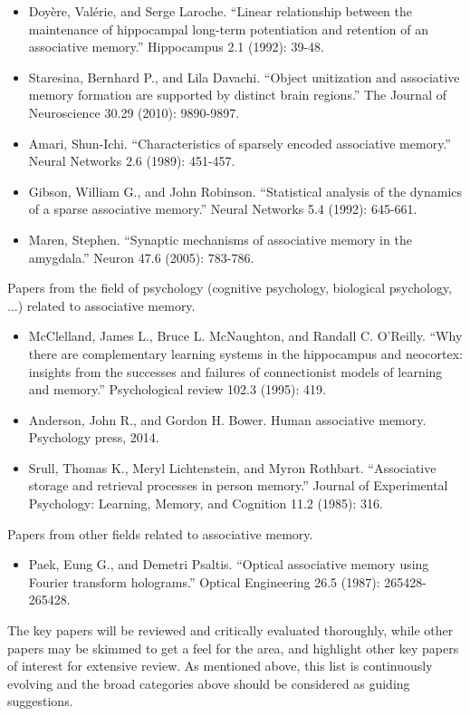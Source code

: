 \documentclass[12pt, a4paper]{article}
\begin{document}
\begin{itemize}
	\item Doyère, Valérie, and Serge Laroche. ``Linear relationship between the maintenance of hippocampal long-term potentiation and retention of an associative memory.'' Hippocampus 2.1 (1992): 39-48.
	\item Staresina, Bernhard P., and Lila Davachi. ``Object unitization and associative memory formation are supported by distinct brain regions.'' The Journal of Neuroscience 30.29 (2010): 9890-9897.
	\item Amari, Shun-Ichi. ``Characteristics of sparsely encoded associative memory.'' Neural Networks 2.6 (1989): 451-457.
	\item Gibson, William G., and John Robinson. ``Statistical analysis of the dynamics of a sparse associative memory.'' Neural Networks 5.4 (1992): 645-661.
	\item Maren, Stephen. ``Synaptic mechanisms of associative memory in the amygdala.'' Neuron 47.6 (2005): 783-786.
\end{itemize}

Papers from the field of psychology (cognitive psychology, biological psychology, ...) related to associative memory.

\begin{itemize}
	\item McClelland, James L., Bruce L. McNaughton, and Randall C. O'Reilly. ``Why there are complementary learning systems in the hippocampus and neocortex: insights from the successes and failures of connectionist models of learning and memory.'' Psychological review 102.3 (1995): 419.
	\item Anderson, John R., and Gordon H. Bower. Human associative memory. Psychology press, 2014.
	\item Srull, Thomas K., Meryl Lichtenstein, and Myron Rothbart. ``Associative storage and retrieval processes in person memory.'' Journal of Experimental Psychology: Learning, Memory, and Cognition 11.2 (1985): 316.
\end{itemize}

Papers from other fields related to associative memory.

\begin{itemize}
	\item Paek, Eung G., and Demetri Psaltis. ``Optical associative memory using Fourier transform holograms.'' Optical Engineering 26.5 (1987): 265428-265428.
\end{itemize}

The key papers will be reviewed and critically evaluated thoroughly, while other papers may be skimmed to get a feel for the area, and highlight other key papers of interest for extensive review. As mentioned above, this list is continuously evolving and the broad categories above should be considered as guiding suggestions.
\end{document}
